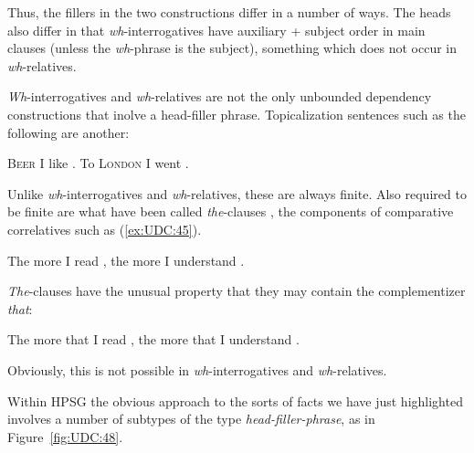 \documentclass[output=paper
                ,modfonts
                ,nonflat
	        ,collection
	        ,collectionchapter
	        ,collectiontoclongg
 	        ,biblatex
                ,babelshorthands
                ,newtxmath
                ,draftmode
                ,colorlinks, citecolor=brown
]{./langsci/langscibook}
\begin{document}
{\noindent
Thus, the fillers in the two constructions differ in a number of ways.
The heads also differ in that \emph{wh}-interrogatives have auxiliary +
subject order in main clauses (unless the \emph{wh}-phrase is the
subject), something which does not occur in \emph{wh}-relatives.

\emph{Wh}-interrogatives and \emph{wh}-relatives are not the only
unbounded dependency constructions that inolve a head-filler phrase.
Topicalization sentences such as the following are another:

\begin{exe} \ex \begin{xlist} \label{ex:UDC:44}
\ex \textsc{Beer} I like \gap{}.
\ex To \textsc{London} I went \gap{}.
\end{xlist}
\end{exe}

\noindent
Unlike \emph{wh}-interrogatives and \emph{wh}-relatives, these are
always finite. Also required to be finite are what have been called
\emph{the}-clauses \citealp{Borsley:04,Sag:10a,Borsley:11}, the components of
comparative correlatives such as (\ref{ex:UDC:45}).

\begin{exe}
\ex \label{ex:UDC:45}
The more I read \gap{}, the more I understand \gap{}.
\end{exe}

\noindent
\emph{The}-clauses have the unusual property that they may contain
the complementizer \emph{that}:

\begin{exe}
\ex \label{ex:UDC:46}
The more that I read \gap{}, the more that I understand \gap{}.
\end{exe}

\noindent
Obviously, this is not possible in \emph{wh}-interrogatives and
\emph{wh}-relatives.

\begin{exe} \ex \begin{xlist} \label{ex:UDC:47}

\end{xlist}
\end{exe}

\noindent
Within HPSG the obvious approach to the sorts of facts we have just
highlighted involves a number of subtypes of the type
\emph{head-filler-phrase}, as in Figure~\ref{fig:UDC:48}.


\begin{figure}[htb]
  \centering


\end{figure}}
\end{document}
